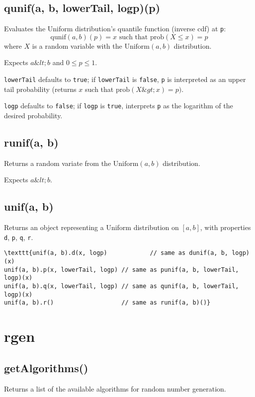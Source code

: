\documentclass{article}
\begin{document}
    \subsection*{qunif(a, b, lowerTail, logp)(p)}
    Evaluates the Uniform distribution's quantile function
(inverse cdf) at \texttt{p}:
$$\textrm{qunif}(a, b)(p) = x \textrm{ such that } \textrm{prob}(X \leq x) = p$$
where $X$ is a random variable with the $\textrm{Uniform}(a, b)$ distribution.


Expects $a \&lt; b$ and $0 \leq p \leq 1$.


\texttt{lowerTail} defaults to \texttt{true}; if \texttt{lowerTail} is \texttt{false}, \texttt{p} is
interpreted as an upper tail probability (returns
$x$ such that $\textrm{prob}(X \&gt; x) = p)$.


\texttt{logp} defaults to \texttt{false}; if \texttt{logp} is \texttt{true}, interprets \texttt{p} as
the logarithm of the desired probability.


    \subsection*{runif(a, b)}
    Returns a random variate from the $\textrm{Uniform}(a,b)$ distribution.


Expects $a\&lt;b$.


    \subsection*{unif(a, b)}
    Returns an object representing a Uniform distribution on $[a, b]$,
with properties \texttt{d}, \texttt{p}, \texttt{q}, \texttt{r}.


\begin{lstlisting}
\texttt{unif(a, b).d(x, logp)            // same as dunif(a, b, logp)(x)
unif(a, b).p(x, lowerTail, logp) // same as punif(a, b, lowerTail, logp)(x)
unif(a, b).q(x, lowerTail, logp) // same as qunif(a, b, lowerTail, logp)(x)
unif(a, b).r()                   // same as runif(a, b)()}\end{lstlisting}

  \section{rgen}
    \subsection*{getAlgorithms()}
    Returns a list of the available algorithms for random number
generation.
\end{document}
